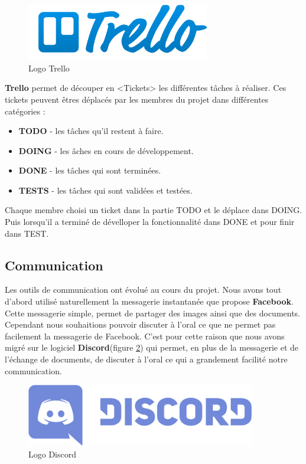 \begin{figure}[H]
\centering
\includegraphics[width=8cm]{images/activite/trelloLogo.png}
\caption{Logo Trello}
\label{trello_logo}
\end{figure}

\textbf{Trello} permet de découper en <Tickets> les différentes t\^aches à réaliser. Ces tickets peuvent \^etres déplacés par les membres du projet dans différentes catégories :

\begin{itemize}
\item \textbf{TODO} - les t\^aches qu'il restent à faire. 
\item \textbf{DOING} - les \^aches en cours de développement.
\item \textbf{DONE} - les t\^aches qui sont terminées.
\item \textbf{TESTS} - les t\^aches qui sont validées et testées.\\
\end{itemize}

Chaque membre choisi un ticket dans la partie TODO et le déplace dans DOING. Puis lorsqu'il a terminé de dévelloper la fonctionnalité dans DONE et pour finir dans TEST.



\subsection{Communication}
Les outils de communication ont évolué au cours du projet. Nous avons tout d'abord utilisé naturellement la messagerie instantanée que propose \textbf{Facebook}. Cette messagerie simple, permet de partager des images ainsi que des documents.
Cependant nous souhaitions pouvoir discuter à l'oral ce que ne permet pas facilement la messagerie de Facebook. C'est pour cette raison que nous avons migré sur le logiciel \textbf{Discord}(figure \ref{discord_logo}) qui permet, en plus de la messagerie et de l'échange de documents, de discuter à l'oral ce qui a grandement facilité notre communication.

\begin{figure}[!h]
\centering
\includegraphics[width=10cm]{./images/activite/discordLogo.png}
\caption{Logo Discord}
\label{discord_logo}
\end{figure}

